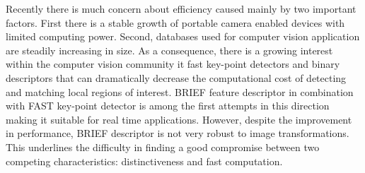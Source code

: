 \documentclass[letterpaper, 10pt, conference]{ieeeconf}
\begin{document}
Recently there is much concern about efficiency caused mainly by two important factors. First there is a stable growth of portable camera enabled devices with limited computing power. Second, databases used for computer vision application are steadily increasing in size. As a consequence, there is a growing interest within the computer vision community it fast key-point detectors and binary descriptors that can dramatically decrease the computational cost of detecting and matching local regions of interest. BRIEF \cite{calonder10} feature descriptor in combination with FAST \cite{rosten06} key-point detector is among the first attempts in this direction making it suitable for real time applications. However, despite the improvement in performance, BRIEF descriptor is not very robust to image transformations. This underlines the difficulty in finding a good compromise between two competing characteristics: distinctiveness and fast computation. 
\end{document}
